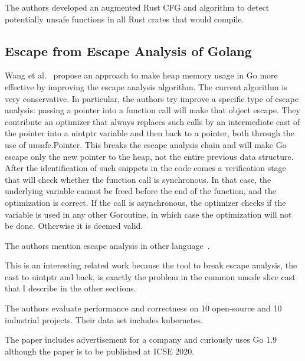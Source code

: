 The authors developed an augmented Rust CFG and algorithm to detect potentially unsafe functions in all Rust crates that
would compile.



\subsection{Escape from Escape Analysis of Golang}
\label{subsec:escape-from-escape-analysis-of-golang}

Wang et al.~\cite{wang2020} propose an approach to make heap memory usage in Go more effective by improving the escape
analysis algorithm.
The current algorithm is very conservative.
In particular, the authors try improve a specific type of escape analysis: passing a pointer into a function call will
make that object escape.
They contribute an optimizer that always replaces such calls by an intermediate cast of the pointer into a uintptr
variable and then back to a pointer, both through the use of unsafe.Pointer.
This breaks the escape analysis chain and will make Go escape only the new pointer to the heap, not the entire previous
data structure.
After the identification of such snippets in the code comes a verification stage that will check whether the function
call is synchronous.
In that case, the underlying variable cannot be freed before the end of the function, and the optimization is correct.
If the call is asynchronous, the optimizer checks if the variable is used in any other Goroutine, in which case the
optimization will not be done.
Otherwise it is deemed valid.

The authors mention escape analysis in other language~\cite{hill2002, hannan1998, choi1999}.

This is an interesting related work because the tool to break escape analysis, the cast to uintptr and back, is exactly
the problem in the common unsafe slice cast that I describe in the other sections.

The authors evaluate performance and correctness on 10 open-source and 10 industrial projects.
Their data set includes kubernetes.

The paper includes advertisement for a company and curiously uses Go 1.9 although the paper is to be published at ICSE
2020.





